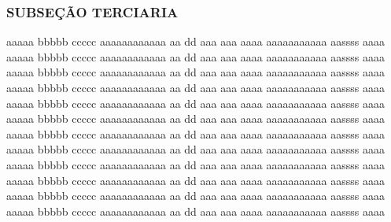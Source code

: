 \subsubsection{SUBSEÇÃO TERCIARIA}
aaaaa bbbbb ccccc aaaaaaaaaaaa aa dd  aaa aaa aaaa aaaaaaaaaaa aassss aaaa
aaaaa bbbbb ccccc aaaaaaaaaaaa aa dd  aaa aaa aaaa aaaaaaaaaaa aassss aaaa
aaaaa bbbbb ccccc aaaaaaaaaaaa aa dd  aaa aaa aaaa aaaaaaaaaaa aassss aaaa
aaaaa bbbbb ccccc aaaaaaaaaaaa aa dd  aaa aaa aaaa aaaaaaaaaaa aassss aaaa
aaaaa bbbbb ccccc aaaaaaaaaaaa aa dd  aaa aaa aaaa aaaaaaaaaaa aassss aaaa
aaaaa bbbbb ccccc aaaaaaaaaaaa aa dd  aaa aaa aaaa aaaaaaaaaaa aassss aaaa
aaaaa bbbbb ccccc aaaaaaaaaaaa aa dd  aaa aaa aaaa aaaaaaaaaaa aassss aaaa
aaaaa bbbbb ccccc aaaaaaaaaaaa aa dd  aaa aaa aaaa aaaaaaaaaaa aassss aaaa
aaaaa bbbbb ccccc aaaaaaaaaaaa aa dd  aaa aaa aaaa aaaaaaaaaaa aassss aaaa
aaaaa bbbbb ccccc aaaaaaaaaaaa aa dd  aaa aaa aaaa aaaaaaaaaaa aassss aaaa
aaaaa bbbbb ccccc aaaaaaaaaaaa aa dd  aaa aaa aaaa aaaaaaaaaaa aassss aaaa
aaaaa bbbbb ccccc aaaaaaaaaaaa aa dd  aaa aaa aaaa aaaaaaaaaaa aassss aaaa